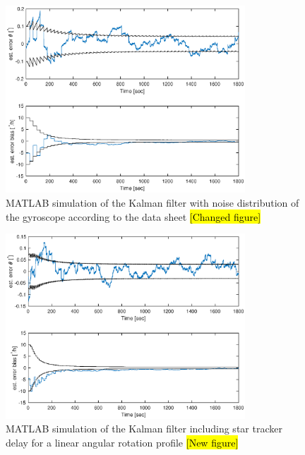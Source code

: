 \begin{figure}[htb]
    \centering
    \includegraphics[width = 0.8\textwidth]{4-experiment-design/img/software/kf_30_0_lin.eps}
    \caption{MATLAB simulation of the Kalman filter with noise distribution of the gyroscope according to the data sheet \hl{[Changed figure]}}
    \label{fig::software::Kalman_filter}
\end{figure}
\begin{figure}[htb]
    \centering
    \includegraphics[width = 0.8\textwidth]{4-experiment-design/img/software/kf_10_8_lin.eps}
    \caption{MATLAB simulation of the Kalman filter including star tracker delay for a linear angular rotation profile \hl{[New figure]}}
    \label{fig::software::Kalman_filter_delay_1}
\end{figure}
